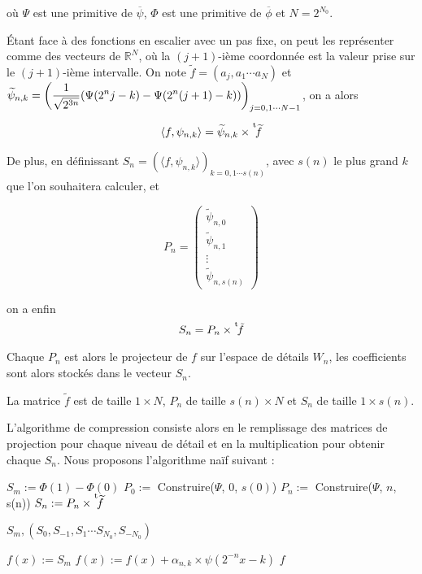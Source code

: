 où $\Psi$ est une primitive de $\overline{\psi}$, $\Phi$ est une primitive de $\overline{\phi}$ et $N = 2^{N_0}$.

Étant face à des fonctions en escalier avec un pas fixe, on peut les représenter comme des vecteurs de $\mathbb{R}^N$, où la $(j+1)$-ième coordonnée est la valeur prise sur le $(j+1)$-ième intervalle. On note $\tilde{f} = (a_j, a_1 \cdots a_N)$ et $\displaystyle \widetilde{\psi}_{n, k} = \left(\frac{1}{\sqrt{2^{3n}}} (\Psi(2^n j - k) - \Psi(2^n (j+1) - k))\right)_{j = 0, 1 \cdots N - 1}$, on a alors 

$$\langle f, \psi_{n, k} \rangle =\widetilde{\psi}_{n, k} \times \mskip1mu\prescript{\smash{\mathrm t\mkern-3mu}}{}{\mathstrut\widetilde{f}}$$

De plus, en définissant $S_n = (\langle f, \psi_{n, k}\rangle)_{k = 0, 1 \cdots s(n)}$, avec $s(n)$ le plus grand $k$ que l'on souhaitera calculer, et

$$P_n = 
\left(
	\begin{array}{c}
		\widetilde{\psi}_{n, 0} \\
		\widetilde{\psi}_{n, 1} \\
		\vdots \\
		\widetilde{\psi}_{n, s(n)} 
	\end{array}
\right)$$

on a enfin $$S_n = P_n\times\mskip1mu\prescript{\smash{\mathrm t\mkern-3mu}}{}{\mathstrut\tilde{f} }$$

Chaque $P_n$ est alors le projecteur de $f$ sur l'espace de détails $W_n$, les coefficients sont alors stockés dans le vecteur $S_n$.

\begin{myrem}
	La matrice $\widetilde{f}$ est de taille $1 \times N$, $P_n$ de taille $s(n) \times N$ et $S_n$ de taille $1 \times s(n)$.
\end{myrem}

L'algorithme de compression consiste alors en le remplissage des matrices de projection pour chaque niveau de détail et en la multiplication pour obtenir chaque $S_n$. Nous proposons l'algorithme naïf suivant :

\begin{algorithm}
	\begin{algorithmic}[1]
			\State $S_m := \Phi(1)-\Phi(0)$
			\State $P_0 := $ Construire($\Psi$, 0, $s(0)$)
				\State $P_n :=$ Construire($\Psi$, $n$, s(n))
				\State $S_n := P_n\times \mskip1mu\prescript{\smash{\mathrm t\mkern-3mu}}{}{\mathstrut\widetilde{f}}$
		
			\EndFor
			\State \Return $S_m,(S_0, S_{-1}, S_{1} \cdots S_{N_0}, S_{-N_0})$
		\EndProcedure

		\Statex

		\State $f(x) := S_m$
		\State $f(x) := f(x) + \alpha_{n, k} \times \psi(2^{-n} x - k)$
		\EndFor
		\EndFor
		\EndFor
		\State \Return $f$
		\EndProcedure
	\end{algorithmic}
\end{algorithm}

